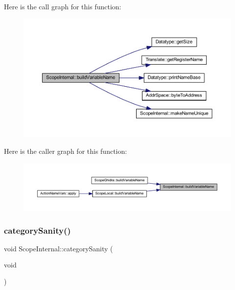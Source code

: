 Here is the call graph for this function\+:
\nopagebreak
\begin{figure}[H]
\begin{center}
\leavevmode
\includegraphics[width=350pt]{class_scope_internal_a6009aeaf0d3973344438fb412adccd00_cgraph}
\end{center}
\end{figure}
Here is the caller graph for this function\+:
\nopagebreak
\begin{figure}[H]
\begin{center}
\leavevmode
\includegraphics[width=350pt]{class_scope_internal_a6009aeaf0d3973344438fb412adccd00_icgraph}
\end{center}
\end{figure}
\mbox{\label{class_scope_internal_a7093bf1f5daeac84fc971fc6ab352224}} 
\subsubsection{\texorpdfstring{categorySanity()}{categorySanity()}}
{\footnotesize\ttfamily void Scope\+Internal\+::category\+Sanity (\begin{DoxyParamCaption}\item[{void}]{ }\end{DoxyParamCaption})\hspace{0.3cm}{\ttfamily [virtual]}}



